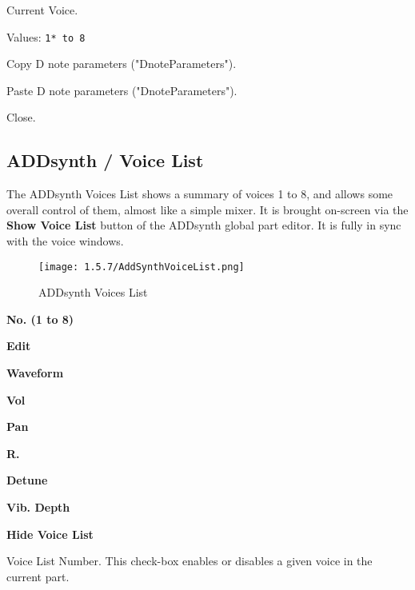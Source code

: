   Current Voice.

   Values: \texttt{1* to 8}

   Copy D note parameters ("DnoteParameters").

   Paste D note parameters ("DnoteParameters").

   Close.

\subsection{ADDsynth / Voice List}
\label{subsec:addsynth_voice_list}

   The ADDsynth Voices List shows a summary of voices 1 to 8, and allows
   some overall control of them, almost like a simple mixer.
   It is brought on-screen via the \textbf{Show Voice List} button
   of the ADDsynth global part editor.
   It is fully in sync with the voice windows.

\begin{figure}[H]
   \centering 
   \texttt{[image: 1.5.7/AddSynthVoiceList.png]}
   \caption{ADDsynth Voices List}
   \label{fig:addsynth_voices_list}
\end{figure}

   \begin{enumber}
      \item \textbf{No. (1 to 8)}
      \item \textbf{Edit}
      \item \textbf{Waveform}
      \item \textbf{Vol}
      \item \textbf{Pan}
      \item \textbf{R.}
      \item \textbf{Detune}
      \item \textbf{Vib. Depth}
      \item \textbf{Hide Voice List}
   \end{enumber}

   \setcounter{ItemCounter}{0}      %

   Voice List Number.
   This check-box enables or disables a given voice in the current part.

